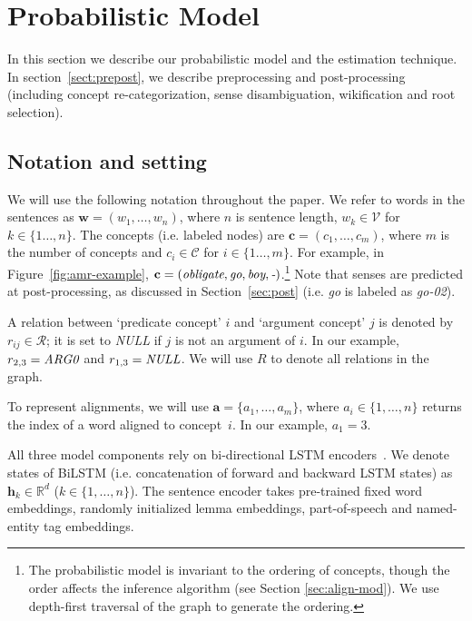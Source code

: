 \documentclass[11pt,a4paper]{article}
\begin{document}
\section{Probabilistic Model}

In this section we describe our probabilistic model and the estimation technique. 
In section~\ref{sect:prepost}, we describe preprocessing and post-processing (including concept re-categorization,  sense disambiguation, wikification  and root selection).



\subsection{Notation and setting}

We will use the following notation throughout the paper.
We refer to words in the sentences as $\mathbf{w} = (w_1,\ldots,w_n)$, where $n$ is sentence length, $w_k \in \mathcal{V}$ for $k \in \{1\ldots,n\}$. The concepts (i.e. labeled nodes) are $\mathbf{c} = (c_1, \ldots, c_m)$, where $m$ is the number of concepts and $c_i \in \mathcal{C}$ for $i \in \{1\ldots,m\}$. For example, in Figure~\ref{fig:amr-example}, $\mathbf{c} = (\mbox{\it obligate}, \mbox{\it go}, \mbox{\it boy}, \mbox{\it -})$.\footnote{The probabilistic model is invariant to the ordering of concepts, though the order affects the inference algorithm (see Section \ref{sec:align-mod}). We use depth-first traversal of the graph to generate the ordering.} Note that senses are predicted at post-processing, as discussed in Section~\ref{sec:post} (i.e. {\it go} is labeled as {\it go-02}).


A relation between `predicate concept' $i$
and `argument concept' $j$ is denoted by $r_{ij} \in \mathcal{R}$; it is set to \textit{NULL} if $j$ is not an argument of $i$.
In our example, $r_{2,3} = \mbox{\it ARG0}$ and $r_{1,3} = \mbox{\it NULL}$. We will use $R$ to denote all relations in the graph. 

To represent alignments, we will use
$\mathbf{a} = \{a_1, \ldots, a_m\}$, where $a_i\in \{1, \ldots, n\}$ returns the index of a word aligned to concept~$i$. In our example, $a_{1} = 3$. 



All three model components rely on  bi-directional LSTM encoders~\cite{BiLSTM}. We denote states of BiLSTM (i.e. concatenation of forward and backward LSTM states) as $\mathbf{h}_k \in \mathbb{R}^d$ ($k \in \{1,\ldots,n\}$).  The sentence encoder takes pre-trained fixed word embeddings, randomly initialized lemma embeddings, part-of-speech  and named-entity tag embeddings. 
\end{document}
